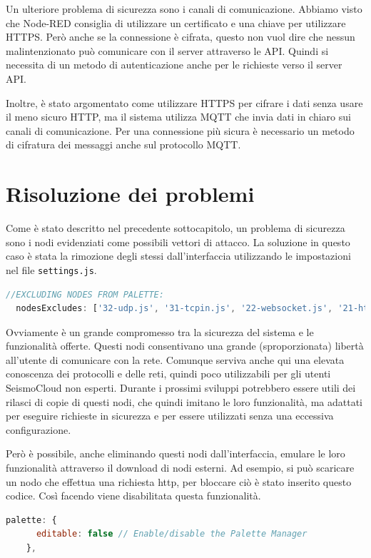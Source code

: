 \documentclass[a4paper,10pt]{memoir}
\begin{document}
Un ulteriore problema di sicurezza sono i canali di comunicazione. Abbiamo visto che Node-RED consiglia di utilizzare un certificato e una chiave per utilizzare HTTPS.
Però anche se la connessione è cifrata, questo non vuol dire che nessun malintenzionato può comunicare con il server attraverso le API.
Quindi si necessita di un metodo di autenticazione anche per le richieste verso il server API.

Inoltre, è stato argomentato come utilizzare HTTPS per cifrare i dati senza usare il meno sicuro HTTP, ma il sistema utilizza MQTT che invia dati in chiaro sui canali di comunicazione.
Per una connessione più sicura è necessario un metodo di cifratura dei messaggi anche sul protocollo MQTT.


\section{Risoluzione dei problemi}

Come è stato descritto nel precedente sottocapitolo, un problema di sicurezza sono i nodi evidenziati come possibili vettori di attacco. La soluzione in questo caso è stata la rimozione degli stessi dall'interfaccia utilizzando le impostazioni nel file \texttt{settings.js}.
\begin{lstlisting}[language=Javascript, firstnumber=75]
//EXCLUDING NODES FROM PALETTE:
  nodesExcludes: ['32-udp.js', '31-tcpin.js', '22-websocket.js', '21-httprequest.js', '21-httpin.js', '10-mqtt.js', '06-httpproxy.js', '05-tls.js', '90-exec.js', 'node-red-node-tail', '10-file.js', '23-watch.js'],
\end{lstlisting}
Ovviamente è un grande compromesso tra la sicurezza del sistema e le funzionalità offerte. Questi nodi consentivano una grande (sproporzionata) libertà all'utente di comunicare con la rete. Comunque serviva anche qui una elevata conoscenza dei protocolli e delle reti, quindi poco utilizzabili per gli utenti SeismoCloud non esperti. Durante i prossimi sviluppi potrebbero essere utili dei rilasci di copie di questi nodi, che quindi imitano le loro funzionalità, ma adattati per eseguire richieste in sicurezza e per essere utilizzati senza una eccessiva configurazione.

Però è possibile, anche eliminando questi nodi dall'interfaccia, emulare le loro funzionalità attraverso il download di nodi esterni.
Ad esempio, si può scaricare un nodo che effettua una richiesta http, per bloccare ciò è stato inserito questo codice. Così facendo viene disabilitata questa funzionalità.
\begin{lstlisting}[language=Javascript, firstnumber=93]
    palette: {
      editable: false // Enable/disable the Palette Manager
    },
\end{lstlisting}
\end{document}
